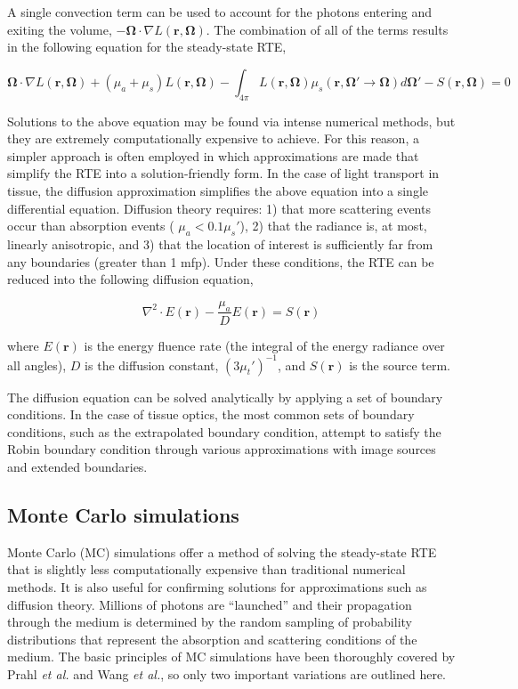 \noindent A single convection term can be used to account for the photons entering and exiting the volume, $-\mathbf{\Omega}\cdot\nabla L(\mathbf{r},\mathbf{\Omega})$. The combination of all of the terms results in the following equation for the steady-state RTE,\cite{Farrell2003}

\begin{equation}
\label{eq:rte}
\mathbf{\Omega}\cdot\nabla L(\mathbf{r},\mathbf{\Omega}) + (\mu_a + \mu_s) L(\mathbf{r},\mathbf{\Omega}) - \int_{4\pi} L(\mathbf{r},\mathbf{\Omega}) \mu_s(\mathbf{r},\mathbf{\Omega}' \rightarrow \mathbf{\Omega}) d \mathbf{\Omega'} - S(\mathbf{r},\mathbf{\Omega}) = 0
\end{equation}

Solutions to the above equation may be found via intense numerical methods, but they are extremely computationally expensive to achieve. For this reason, a simpler approach is often employed in which approximations are made that simplify the RTE into a solution-friendly form. In the case of light transport in tissue, the diffusion approximation simplifies the above equation into a single differential equation. Diffusion theory requires: 1) that more scattering events occur than absorption events ( $ \mu_a < 0.1\mu_s'$), 2) that the radiance is, at most, linearly anisotropic, and 3) that the location of interest is sufficiently far from any boundaries (greater than 1 mfp).\cite{Jacques2004,Wilson2008} Under these conditions, the RTE can be reduced into the following diffusion equation,

\begin{equation}
\label{eq:diffeq}
\nabla^2 \cdot E(\mathbf{r}) - \frac{\mu_a}{D}E(\mathbf{r}) = S(\mathbf{r})
\end{equation}

where $E(\mathbf{r})$ is the energy fluence rate (the integral of the energy radiance over all angles), $D$ is the diffusion constant, $(3\mu_t')^{-1}$, and $S(\mathbf{r})$ is the source term.

The diffusion equation can be solved analytically by applying a set of boundary conditions. In the case of tissue optics, the most common sets of boundary conditions, such as the extrapolated boundary condition, attempt to satisfy the Robin boundary condition through various approximations with image sources and extended boundaries.\cite{Prahl1995}

\subsection{Monte Carlo simulations}
\label{sec:mc}
Monte Carlo (MC) simulations offer a method of solving the steady-state RTE that is slightly less computationally expensive than traditional numerical methods. It is also useful for confirming solutions for approximations such as diffusion theory. Millions of photons are ``launched'' and their propagation through the medium is determined by the random sampling of probability distributions that represent the absorption and scattering conditions of the medium. The basic principles of MC simulations have been thoroughly covered by Prahl \emph{et al.}\cite{Prahl1989} and Wang \emph{et al.},\cite{Wang1995} so only two important variations are outlined here.

